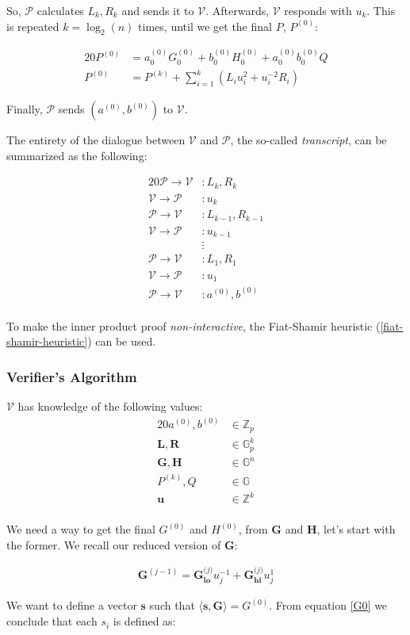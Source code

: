 \documentclass{article}
\newcommand{\eq}[1]{\begin{alignat*}{20}#1\end{alignat*}}
\newcommand{\eqn}[2]{\begin{equation}\label{#1}\begin{split}#2\end{split}\end{equation}}
\renewcommand{\vec}[1]{\boldsymbol{#1}}
\newcommand{\V}{\mathcal{V}}
\renewcommand{\P}{\mathcal{P}}
\newcommand{\G}{\mathbb{G}}
\newcommand{\Z}{\mathbb{Z}}
\newcommand{\dotp}[2]{\langle #1, #2 \rangle}
\newcommand{\opn}[1]{\operatorname{#1}}
\newcommand{\veclo}[1]{\vec{#1_{\opn{lo}}}}
\newcommand{\vechi}[1]{\vec{#1_{\opn{hi}}}}
\begin{document}
So, $\P$ calculates $L_k, R_k$ and sends it to $\V$. Afterwards,
$\V$ responds with $u_k$. This is repeated $k = \log_2(n)$ times,
until we get the final $P$, $P^{(0)}$:

\eq{
	P^{(0)} &= a^{(0)}_0 G^{(0)}_0 + b^{(0)}_0 H^{(0)}_0 + a^{(0)}_0 b^{(0)}_0 Q \\
	P^{(0)} &= P^{(k)} + \sum^k_{i=1}(L_i u^2_i + u^{-2}_i R_i)
}

Finally, $\P$ sends $(a^{(0)}, b^{(0)})$ to $\V$.

The entirety of the dialogue between $\V$ and $\P$,
the so-called \textit{transcript}, can be summarized as the following:

\eq{
	\P \rightarrow \V &: L_k, R_k \\
	\V \rightarrow \P &: u_k \\[5pt]
	\P \rightarrow \V &: L_{k-1}, R_{k-1} \\
	\V \rightarrow \P &: u_{k-1} \\[-5pt]
	                  &\vdots \\
	\P \rightarrow \V &: L_{1}, R_{1} \\
	\V \rightarrow \P &: u_{1} \\[5pt]
	\P \rightarrow \V &: a^{(0)}, b^{(0)} \\
}

To make the inner product proof \textit{non-interactive}, the
Fiat-Shamir heuristic (\ref{fiat-shamir-heuristic}) can be used.

\subsubsection{Verifier's Algorithm}

$\V$ has knowledge of the following values:
\eq{
	a^{(0)}, b^{(0)} &\in \Z_p \\
	\vec{L}, \vec{R} &\in \G_p^{k} \\
	\vec{G}, \vec{H} &\in \G^n \\
	P^{(k)}, Q &\in \G \\
	\vec{u} &\in \Z^{k} \\
}

We need a way to get the final $G^{(0)}$ and $H^{(0)}$, from $\vec{G}$
and $\vec{H}$, let's start with the former. We recall our reduced
version of $\vec{G}$:

\eqn{G0}{
	\vec{G}^{(j-1)} = \veclo{G^\textit{(j)}} u^{-1}_j + \vechi{G^\textit{(j)}} u^{1}_j
}

We want to define a vector $\vec{s}$ such that $\dotp{\vec{s}}{\vec{G}}
= G^{(0)}$. From equation \ref{G0} we conclude that each $s_i$ is
defined as:
\end{document}
